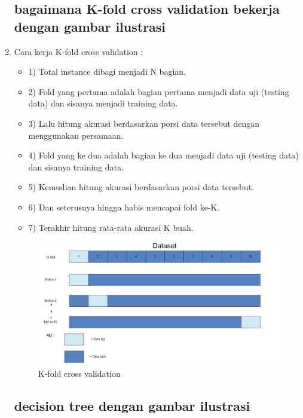 \begin{enumerate}
\subsection{bagaimana K-fold cross validation bekerja dengan gambar ilustrasi}

\item Cara kerja K-fold cross validation :
\begin{itemize}
\item 1) Total instance dibagi menjadi N bagian.
\item 2) Fold yang pertama adalah bagian pertama menjadi data uji (testing data) dan sisanya menjadi training data.
\item 3) Lalu hitung akurasi berdasarkan porsi data tersebut dengan menggunakan persamaan.
\item 4) Fold yang ke dua adalah bagian ke dua menjadi data uji (testing data) dan sisanya training data. 
\item 5) Kemudian hitung akurasi berdasarkan porsi data tersebut.
\item 6) Dan seterusnya hingga habis mencapai fold ke-K.
\item 7) Terakhir hitung rata-rata akurasi K buah.
\end{itemize}

\begin{figure}[ht]
\centering
\includegraphics[scale=0.5]{figures/f5.jpg}
\caption{K-fold cross validation }
\label{contoh}
\end{figure}

\subsection{decision tree dengan gambar ilustrasi}


\end{enumerate}
